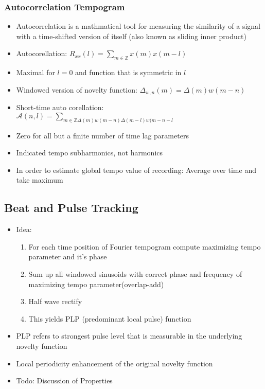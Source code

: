 \documentclass{scrartcl}
\begin{document}
\subsubsection*{Autocorrelation Tempogram}
\begin{itemize}
    \item
	Autocorrelation is a mathmatical tool for measuring the similarity of a signal with a time-shifted version of itself (also known as sliding inner product)
    \item
	Autocorellation: $R_{xx}(l) = \sum_{m \in \mathbb{Z}} x(m)x(m-l)$
    \item
	Maximal for $l=0$ and function that is symmetric in $l$
    \item
	Windowed version of novelty function: $\Delta_{w,n} (m) = \Delta (m) w(m-n)$
    \item
	Short-time auto corellation: $\mathcal{A}(n,l) = \sum_{m \in \mathbb{Z} \Delta (m) w(m-n) \Delta (m-l) w(m-n-l}$
    \item
	Zero for all but a finite number of time lag parameters
    \item
	Indicated tempo subharmonics, not harmonics
    \item
	In order to estimate global tempo value of recording: Average over time and take maximum
\end{itemize}

\subsection*{Beat and Pulse Tracking}
\begin{itemize}
    \item
	Idea:
	\begin{enumerate}
	    \item
		For each time position of Fourier tempogram compute maximizing tempo parameter and it's phase
	    \item
		Sum up all windowed sinusoids with correct phase and frequency of maximizing tempo parameter(overlap-add)
	    \item
		Half wave rectify
	    \item
		This yields PLP (predominant local pulse) function

	\end{enumerate}
    \item
	PLP refers to strongest pulse level that is measurable in the underlying novelty function
    \item
	Local periodicity enhancement of the original novelty function
    \item
	Todo: Discussion of Properties
\end{itemize}
\end{document}
